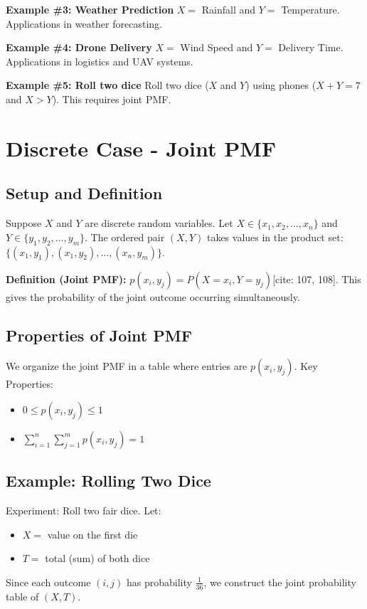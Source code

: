 \documentclass[12pt]{article}
\begin{document}
\textbf{Example \#3: Weather Prediction} 
$X = $ Rainfall and $Y = $ Temperature. Applications in weather forecasting.

\textbf{Example \#4: Drone Delivery} 
$X = $ Wind Speed and $Y = $ Delivery Time. Applications in logistics and UAV systems.

\textbf{Example \#5: Roll two dice}
Roll two dice ($X$ and $Y$) using phones ($X+Y=7$ and $X>Y$). This requires joint PMF.

\section{Discrete Case - Joint PMF}
\subsection{Setup and Definition}
Suppose $X$ and $Y$ are discrete random variables.
Let $X \in \{x_1, x_2, \dots, x_n\}$ and $Y \in \{y_1, y_2, \dots, y_m\}$.
The ordered pair $(X, Y)$ takes values in the product set:
$\{(x_1, y_1), (x_1, y_2), \dots, (x_n, y_m)\}$.

\textbf{Definition (Joint PMF):}
$p(x_i, y_j) = P(X = x_i, Y = y_j)$[cite: 107, 108].
This gives the probability of the joint outcome occurring simultaneously.

\subsection{Properties of Joint PMF}
We organize the joint PMF in a table where entries are $p(x_i, y_j)$.
Key Properties:
\begin{itemize}
    \item $0 \le p(x_i, y_j) \le 1$ 
    \item $\sum_{i=1}^{n} \sum_{j=1}^{m} p(x_i, y_j) = 1$
\end{itemize}

\subsection{Example: Rolling Two Dice}
Experiment: Roll two fair dice. Let:
\begin{itemize}
    \item $X = $ value on the first die 
    \item $T = $ total (sum) of both dice 
\end{itemize}
Since each outcome $(i,j)$ has probability $\frac{1}{36}$, we construct the joint probability table of $(X, T)$.
\end{document}
